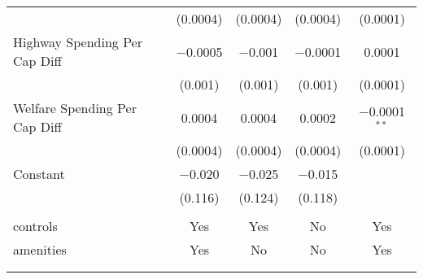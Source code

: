 \begin{table}[!htbp]
\begin{tabular}{@{\extracolsep{5pt}}lcccc}
  & (0.0004) & (0.0004) & (0.0004) & (0.0001) \\ 
  Highway Spending Per Cap Diff & $-$0.0005 & $-$0.001 & $-$0.0001 & 0.0001 \\ 
  & (0.001) & (0.001) & (0.001) & (0.0001) \\ 
  Welfare Spending Per Cap Diff & 0.0004 & 0.0004 & 0.0002 & $-$0.0001$^{**}$ \\ 
  & (0.0004) & (0.0004) & (0.0004) & (0.0001) \\ 
  Constant & $-$0.020 & $-$0.025 & $-$0.015 &  \\ 
  & (0.116) & (0.124) & (0.118) &  \\ 
 \hline \\[-1.8ex] 
controls & Yes & Yes & No & Yes \\ 
amenities & Yes & No & No & Yes \\ 
\hline \\[-1.8ex] 
\hline 
\hline \\[-1.8ex] 
\end{tabular} 
\end{table} 
